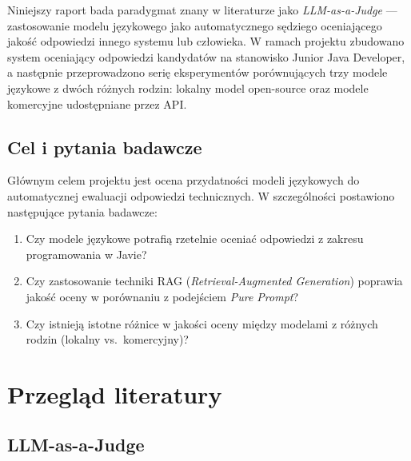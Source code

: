\documentclass[12pt, a4paper]{article}
\begin{document}
Niniejszy raport bada paradygmat znany w literaturze jako \textit{LLM-as-a-Judge}
\cite{zheng2023judging} — zastosowanie modelu językowego jako automatycznego sędziego
oceniającego jakość odpowiedzi innego systemu lub człowieka.
W ramach projektu zbudowano system oceniający odpowiedzi kandydatów na stanowisko
Junior Java Developer, a następnie przeprowadzono serię eksperymentów porównujących
trzy modele językowe z dwóch różnych rodzin: lokalny model open-source oraz modele
komercyjne udostępniane przez API.

\subsection{Cel i pytania badawcze}

Głównym celem projektu jest ocena przydatności modeli językowych do automatycznej
ewaluacji odpowiedzi technicznych. W szczególności postawiono następujące pytania badawcze:

\begin{enumerate}
    \item Czy modele językowe potrafią rzetelnie oceniać odpowiedzi z zakresu
          programowania w Javie?
    \item Czy zastosowanie techniki RAG (\textit{Retrieval-Augmented Generation})
          poprawia jakość oceny w porównaniu z podejściem \textit{Pure Prompt}?
    \item Czy istnieją istotne różnice w jakości oceny między modelami z różnych
          rodzin (lokalny vs.\ komercyjny)?
\end{enumerate}

\section{Przegląd literatury}

\subsection{LLM-as-a-Judge}
\end{document}
